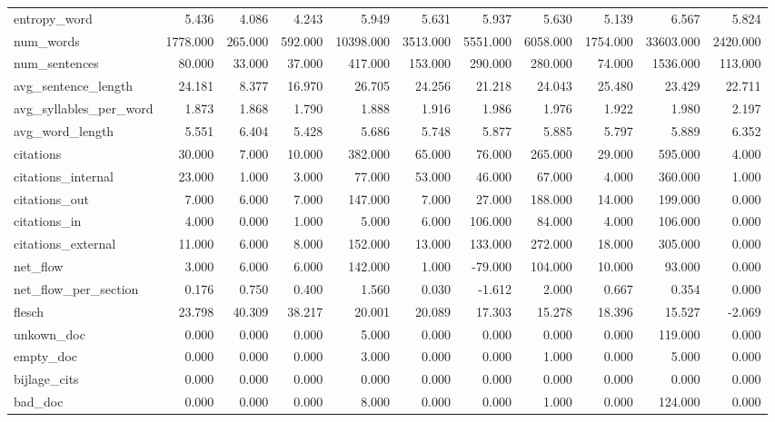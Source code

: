 \begin{tabular}{lrrrrrrrrrr}
\cline{1-11}
entropy\_word & 5.436 & 4.086 & 4.243 & 5.949 & 5.631 & 5.937 & 5.630 & 5.139 & 6.567 & 5.824 \\
\cline{1-11}
num\_words & 1778.000 & 265.000 & 592.000 & 10398.000 & 3513.000 & 5551.000 & 6058.000 & 1754.000 & 33603.000 & 2420.000 \\
\cline{1-11}
num\_sentences & 80.000 & 33.000 & 37.000 & 417.000 & 153.000 & 290.000 & 280.000 & 74.000 & 1536.000 & 113.000 \\
\cline{1-11}
avg\_sentence\_length & 24.181 & 8.377 & 16.970 & 26.705 & 24.256 & 21.218 & 24.043 & 25.480 & 23.429 & 22.711 \\
\cline{1-11}
avg\_syllables\_per\_word & 1.873 & 1.868 & 1.790 & 1.888 & 1.916 & 1.986 & 1.976 & 1.922 & 1.980 & 2.197 \\
\cline{1-11}
avg\_word\_length & 5.551 & 6.404 & 5.428 & 5.686 & 5.748 & 5.877 & 5.885 & 5.797 & 5.889 & 6.352 \\
\cline{1-11}
citations & 30.000 & 7.000 & 10.000 & 382.000 & 65.000 & 76.000 & 265.000 & 29.000 & 595.000 & 4.000 \\
\cline{1-11}
citations\_internal & 23.000 & 1.000 & 3.000 & 77.000 & 53.000 & 46.000 & 67.000 & 4.000 & 360.000 & 1.000 \\
\cline{1-11}
citations\_out & 7.000 & 6.000 & 7.000 & 147.000 & 7.000 & 27.000 & 188.000 & 14.000 & 199.000 & 0.000 \\
\cline{1-11}
citations\_in & 4.000 & 0.000 & 1.000 & 5.000 & 6.000 & 106.000 & 84.000 & 4.000 & 106.000 & 0.000 \\
\cline{1-11}
citations\_external & 11.000 & 6.000 & 8.000 & 152.000 & 13.000 & 133.000 & 272.000 & 18.000 & 305.000 & 0.000 \\
\cline{1-11}
net\_flow & 3.000 & 6.000 & 6.000 & 142.000 & 1.000 & -79.000 & 104.000 & 10.000 & 93.000 & 0.000 \\
\cline{1-11}
net\_flow\_per\_section & 0.176 & 0.750 & 0.400 & 1.560 & 0.030 & -1.612 & 2.000 & 0.667 & 0.354 & 0.000 \\
\cline{1-11}
flesch & 23.798 & 40.309 & 38.217 & 20.001 & 20.089 & 17.303 & 15.278 & 18.396 & 15.527 & -2.069 \\
\cline{1-11}
unkown\_doc & 0.000 & 0.000 & 0.000 & 5.000 & 0.000 & 0.000 & 0.000 & 0.000 & 119.000 & 0.000 \\
\cline{1-11}
empty\_doc & 0.000 & 0.000 & 0.000 & 3.000 & 0.000 & 0.000 & 1.000 & 0.000 & 5.000 & 0.000 \\
\cline{1-11}
bijlage\_cits & 0.000 & 0.000 & 0.000 & 0.000 & 0.000 & 0.000 & 0.000 & 0.000 & 0.000 & 0.000 \\
\cline{1-11}
bad\_doc & 0.000 & 0.000 & 0.000 & 8.000 & 0.000 & 0.000 & 1.000 & 0.000 & 124.000 & 0.000 \\
\cline{1-11}
\bottomrule
\end{tabular}
